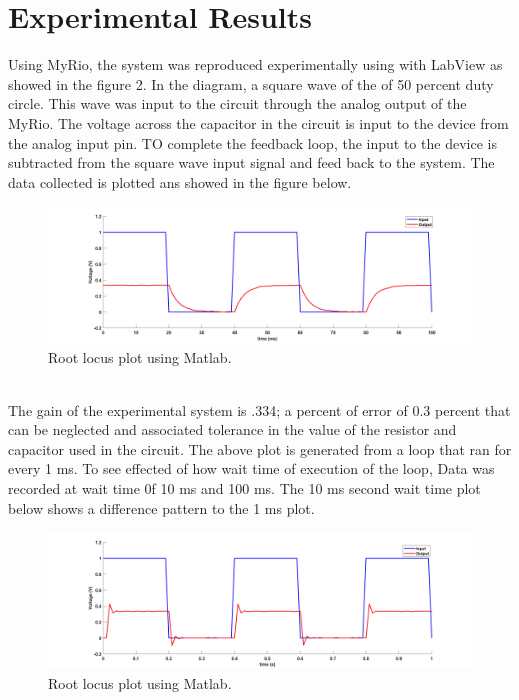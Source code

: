 \documentclass[12pt,letterpaper]{article}
\begin{document}
\section*{Experimental Results}
Using MyRio, the system was reproduced experimentally using with LabView as showed
in the figure 2. In the diagram, a square wave of the  of 50 percent duty circle.
This wave was input to the circuit through the analog output of the MyRio. The 
voltage across the capacitor in the circuit is input to the device from the analog input
pin. TO complete the feedback loop, the input to the device is subtracted from the 
square wave input signal and feed back to the system. The data collected is plotted ans showed
in the figure below.\\
\begin{figure}[h]
    \centering
    \includegraphics[width=15cm]{expstepin.jpg}
    \caption{Root locus plot using Matlab.}
\end{figure}\\
The gain of the experimental system is .334; a percent of error of
0.3 percent that can be neglected and associated tolerance
in the value of the resistor and capacitor used in the circuit. The 
above plot is generated from a loop that ran for every 1 ms.
To see effected of how wait time of execution of the loop,
Data was recorded at wait time 0f 10 ms and 100 ms. The 10 ms second
wait time plot below shows a difference pattern to the 1 ms plot.\\
\begin{figure}[h]
    \centering
    \includegraphics[width=15cm]{expstepin10.jpg}
    \caption{Root locus plot using Matlab.}
\end{figure}\\
\end{document}

